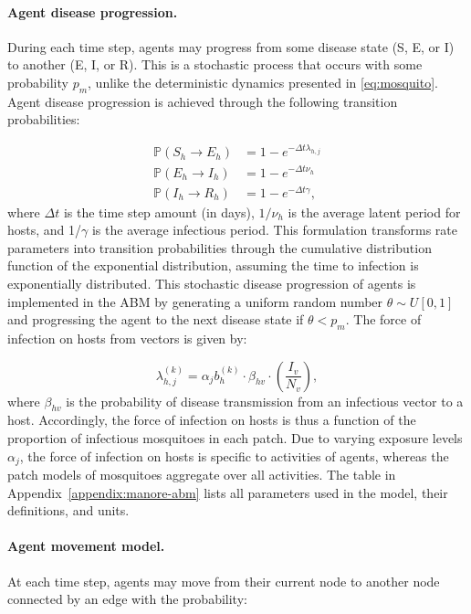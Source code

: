 \paragraph{Agent disease progression.} During each time step, agents may progress from some disease state (S, E, or I) to another (E, I, or R). This is a stochastic process that occurs with some probability $p_m$, unlike the deterministic dynamics presented in \eqref{eq:mosquito}. Agent disease progression is achieved through the following transition probabilities:

\begin{equation} \label{eq:agents}
    \begin{aligned}
    \mathbb{P}(S_h\to E_h)&=1-e^{-\Delta t \lambda_{h,j}} \\
    \mathbb{P}(E_h\to I_h)&=1-e^{-\Delta t \nu_h} \\
    \mathbb{P}(I_h\to R_h)&=1-e^{-\Delta t \gamma},
    \end{aligned}
\end{equation}
where $\Delta t$ is the time step amount (in days), $1/\nu_h$ is the average latent period for hosts, and 1/$\gamma$ is the average infectious period. This formulation transforms rate parameters into transition probabilities through the cumulative distribution function of the exponential distribution, assuming the time to infection is exponentially distributed. This stochastic disease progression of agents is implemented in the ABM by generating a uniform random number $\theta\sim U[0,1]$ and progressing the agent to the next disease state if $\theta < p_m$. The force of infection on hosts from vectors is given by:

\begin{equation}
    \lambda_{h,j}^{(k)}=\alpha_jb^{(k)}_h\cdot \beta_{hv} \cdot \left(\frac{I_v}{N_v}\right),
\end{equation}
where $\beta_{hv}$ is the probability of disease transmission from an infectious vector to a host. Accordingly, the force of infection on hosts is thus a function of the proportion of infectious mosquitoes in each patch. Due to varying exposure levels $\alpha_j$, the force of infection on hosts is specific to activities of agents, whereas the patch models of mosquitoes aggregate over all activities. The table in Appendix~\ref{appendix:manore-abm} lists all parameters used in the model, their definitions, and units.

\paragraph{Agent movement model.} At each time step, agents may move from their current node to another node connected by an edge with the probability:

